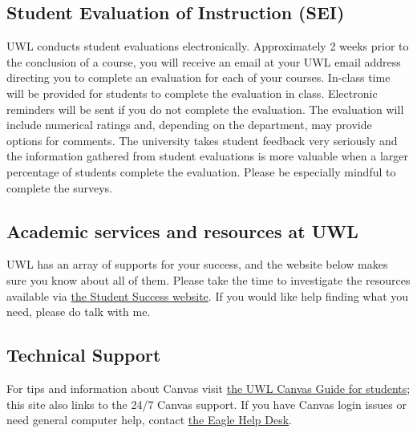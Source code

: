 \documentclass[
    letterpaper,paper=portrait,fleqn,
    DIV=16,fontsize=11pt,twoside=semi,
    parskip=full-,
    headings=standardclasses]
{scrartcl}
\begin{document}
\subsection*{Student Evaluation of Instruction (SEI)}

UWL conducts student evaluations electronically. Approximately 2 weeks prior to the conclusion of a course, you will receive an email at your UWL email address directing you to complete an evaluation for each of your courses. In-class time will be provided for students to complete the evaluation in class. Electronic reminders will be sent if you do not complete the evaluation. The evaluation will include numerical ratings and, depending on the department, may provide options for comments. The university takes student feedback very seriously and the information gathered from student evaluations is more valuable when a larger percentage of students complete the evaluation. Please be especially mindful to complete the surveys.

\subsection*{Academic services and resources at UWL}

UWL has an array of supports for your success, and the website below makes sure you know about all of them. Please take the time to investigate the resources available via \href{https://www.uwlax.edu/info/student-success}{the Student Success website}. If you would like help finding what you need, please do talk with me.

\subsection*{Technical Support}

For tips and information about Canvas visit \href{https://www.uwlax.edu/info/canvas/students/}{the UWL Canvas Guide for students}; this site also links to the 24/7 Canvas support. If you have Canvas login issues or need general computer help, contact \href{https://www.uwlax.edu/its/client-services-and-support/eagle-help-desk/}{the Eagle Help Desk}.
\end{document}
